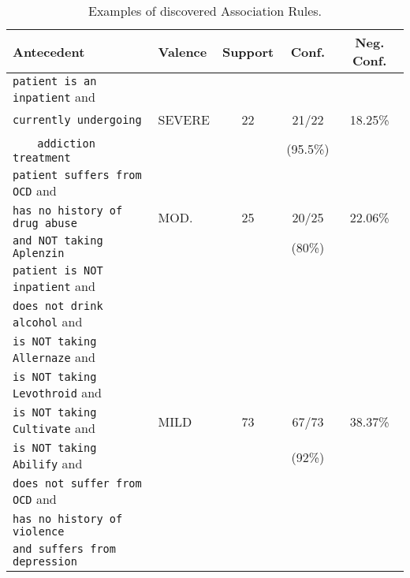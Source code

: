 \begin{table}
     \centering
     \begin{tabular}{|l|l|c|c|c|}
    \hline
    \textsf{Antecedent}& \textsf{Valence} & \textsf{Support}& \textsf{Conf.} &
    \textsf{Neg. Conf.}\\
    \hline
    \small{\texttt{patient is an inpatient} and}  &    &     &   & \\
    \small{\texttt{currently undergoing}} & \textsf{SEVERE} & 22 & 21/22 & 18.25\%\\
    $\ \ \ \ \ $ \small{\texttt{ addiction treatment}} & & & (95.5\%) & \\
    \hline
    \small{\texttt{patient suffers from OCD} and}  &   & & & \\
    \small{\texttt{has no history of drug abuse}} & \textsf{MOD.} & 25 & 20/25 & 22.06\%\\
    \small{\texttt{and NOT taking Aplenzin}} & & & (80\%)  & \\
    \hline
    \small{\texttt{patient is NOT inpatient} and}  & & & & \\
    \small{\texttt{does not drink alcohol} and}  & & & & \\
    \small{\texttt{is NOT taking Allernaze} and}  & & & & \\
    \small{\texttt{is NOT taking Levothroid} and}  & & & & \\
    \small{\texttt{is NOT taking Cultivate} and} & \textsf{MILD} & 73 & 67/73 & 38.37\%\\
    \small{\texttt{is NOT taking Abilify} and}  & & & (92\%) & \\
    \small{\texttt{does not suffer from OCD} and}  & & & & \\
    \small{\texttt{has no history of violence}} & & & & \\
    \small{\texttt{and suffers from depression}} & & & & \\
    \hline
     \end{tabular}
     \caption{Examples of discovered Association Rules.}
     \label{tab:ARexamples}
 \end{table}